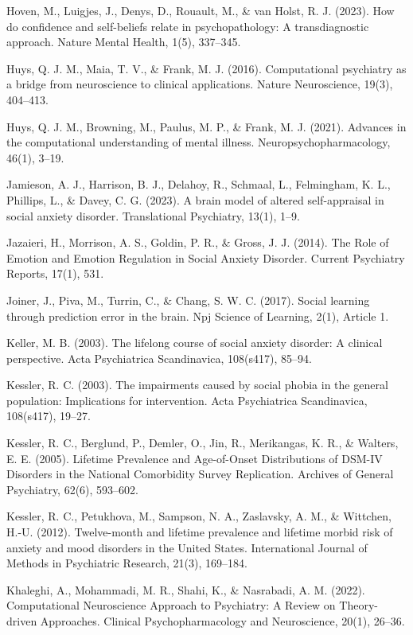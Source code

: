 \documentclass[12pt,a4paper,oneside,]{book} %
\begin{document}
Hoven, M., Luigjes, J., Denys, D., Rouault, M., \& van Holst, R. J. (2023). How do confidence and self-beliefs relate in psychopathology: A transdiagnostic approach. Nature Mental Health, 1(5), 337--345.

Huys, Q. J. M., Maia, T. V., \& Frank, M. J. (2016). Computational psychiatry as a bridge from neuroscience to clinical applications. Nature Neuroscience, 19(3), 404--413.

Huys, Q. J. M., Browning, M., Paulus, M. P., \& Frank, M. J. (2021). Advances in the computational understanding of mental illness. Neuropsychopharmacology, 46(1), 3--19.

Jamieson, A. J., Harrison, B. J., Delahoy, R., Schmaal, L., Felmingham, K. L., Phillips, L., \& Davey, C. G. (2023). A brain model of altered self-appraisal in social anxiety disorder. Translational Psychiatry, 13(1), 1--9.

Jazaieri, H., Morrison, A. S., Goldin, P. R., \& Gross, J. J. (2014). The Role of Emotion and Emotion Regulation in Social Anxiety Disorder. Current Psychiatry Reports, 17(1), 531.

Joiner, J., Piva, M., Turrin, C., \& Chang, S. W. C. (2017). Social learning through prediction error in the brain. Npj Science of Learning, 2(1), Article 1.

Keller, M. B. (2003). The lifelong course of social anxiety disorder: A clinical perspective. Acta Psychiatrica Scandinavica, 108(s417), 85--94.

Kessler, R. C. (2003). The impairments caused by social phobia in the general population: Implications for intervention. Acta Psychiatrica Scandinavica, 108(s417), 19--27.

Kessler, R. C., Berglund, P., Demler, O., Jin, R., Merikangas, K. R., \& Walters, E. E. (2005). Lifetime Prevalence and Age-of-Onset Distributions of DSM-IV Disorders in the National Comorbidity Survey Replication. Archives of General Psychiatry, 62(6), 593--602.

Kessler, R. C., Petukhova, M., Sampson, N. A., Zaslavsky, A. M., \& Wittchen, H.-U. (2012). Twelve-month and lifetime prevalence and lifetime morbid risk of anxiety and mood disorders in the United States. International Journal of Methods in Psychiatric Research, 21(3), 169--184.

Khaleghi, A., Mohammadi, M. R., Shahi, K., \& Nasrabadi, A. M. (2022). Computational Neuroscience Approach to Psychiatry: A Review on Theory-driven Approaches. Clinical Psychopharmacology and Neuroscience, 20(1), 26--36.
\end{document}
